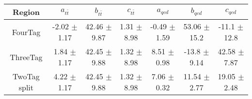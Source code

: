 \begin{footnotesize} 
\begin{tabular}{c|c|c|c|c|c|c} 
Region & $ a_{t\bar{t}}$ & $ b_{t\bar{t}}$ & $ c_{t\bar{t}}$ & $ a_{qcd}$ & $ b_{qcd}$ & $c_{qcd}$ \\ 
\hline\hline 
FourTag & -2.02 $\pm$ 1.17 & 42.46 $\pm$ 9.87 & 1.31 $\pm$ 8.98 & -0.49 $\pm$ 1.59 & 53.06 $\pm$ 15.2 & -11.1 $\pm$ 12.8\\ 
ThreeTag & 1.84 $\pm$ 1.17 & 42.45 $\pm$ 9.88 & 1.32 $\pm$ 8.98 & 8.51 $\pm$ 0.98 & -13.8 $\pm$ 9.14 & 42.58 $\pm$ 7.87\\ 
TwoTag split & 4.22 $\pm$ 1.17 & 42.45 $\pm$ 9.88 & 1.32 $\pm$ 8.98 & 7.06 $\pm$ 0.32 & 11.54 $\pm$ 2.77 & 19.05 $\pm$ 2.48\\ 
\hline\hline 
\end{tabular} 
\end{footnotesize} 
\newline 
